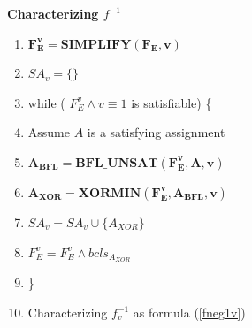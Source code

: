 \documentclass[journal]{IEEEtran}
\begin{document}
\vspace{0.2cm}

\begin{algo}\label{buildfdec_frm}
\textbf{Characterizing $f^{-1}$}
\begin{enumerate}%
\item \hspace{0.3cm} $\boldsymbol{F_E^v= SIMPLIFY(F_E,v)}$
\item \hspace{0.3cm} $SA_v= \{\}$
\item \hspace{0.3cm} while ( $F_E^v\wedge v\equiv 1$ is satisfiable) \{
\item \hspace{0.6cm} Assume $A$ is a satisfying assignment
\item \hspace{0.6cm} $\boldsymbol{A_{BFL}= BFL\_UNSAT(F_E^v,A,v)}$
\item \hspace{0.6cm} $\boldsymbol{A_{XOR}= XORMIN(F_E^v, A_{BFL},v)}$
\item \hspace{0.6cm} $SA_v= SA_v \cup \{ A_{XOR} \}$
\item \hspace{0.6cm} $F_E^v= F_E^v\wedge bcls_{A_{XOR}}$
\item \hspace{0.3cm} \}
\item \hspace{0.3cm} Characterizing $f^{-1}_v$ as formula (\ref{fneg1v})
\end{enumerate}
\end{algo}
\end{document}
